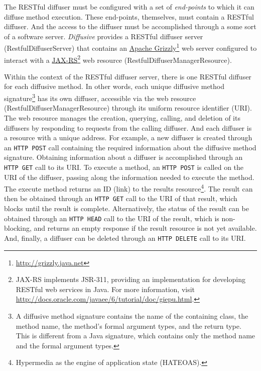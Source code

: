 \documentclass[11pt]{scrartcl}
\begin{document}
The RESTful diffuser must be configured with a set of \emph{end-points} to which it can diffuse method execution. These end-points, themselves, must contain a RESTful diffuser. And the access to the diffuser must be accomplished through a some sort of a software server. \emph{Diffusive} provides a RESTful diffuser server (\textsf{RestfulDiffuserServer}) that contains an \href{http://grizzly.java.net}{Apache Grizzly}\footnote{\url{http://grizzly.java.net}} web server configured to interact with a \href{http://docs.oracle.com/javaee/6/tutorial/doc/giepu.html}{JAX-RS}\footnote{JAX-RS implements JSR-311, providing an implementation for developing RESTful web services in Java. For more information, visit \url{http://docs.oracle.com/javaee/6/tutorial/doc/giepu.html}.} web resource (\textsf{RestfulDiffuserManagerResource}).

Within the context of the RESTful diffuser server, there is one RESTful diffuser for each diffusive method. In other words, each unique diffusive method signature\footnote{A diffusive method signature contains the name of the containing class, the method name, the method's formal argument types, and the return type. This is different from a Java signature, which contains only the method name and the formal argument types.} has its own diffuser, accessible via the web resource (\textsf{RestfulDiffuserManagerResource}) through its uniform resource identifier (URI). The web resource manages the creation, querying, calling, and deletion of its diffusers by responding to requests from the calling diffuser. And each diffuser is a resource with a unique address. For example, a new diffuser is created through an \texttt{HTTP POST} call containing the required information about the diffusive method signature. Obtaining information about a diffuser is accomplished through an \texttt{HTTP GET} call to its URI. To execute a method, an \texttt{HTTP POST} is called on the URI of the diffuser, passing along the information needed to execute the method. The execute method returns an ID (link) to the results resource\footnote{Hypermedia as the engine of application state (HATEOAS).}. The result can then be obtained through an \texttt{HTTP GET} call to the URI of that result, which blocks until the result is complete. Alternatively, the status of the result can be obtained through an \texttt{HTTP HEAD} call to the URI of the result, which is non-blocking, and returns an empty response if the result resource is not yet available. And, finally, a diffuser can be deleted through an \texttt{HTTP DELETE} call to its URI.
\end{document}
